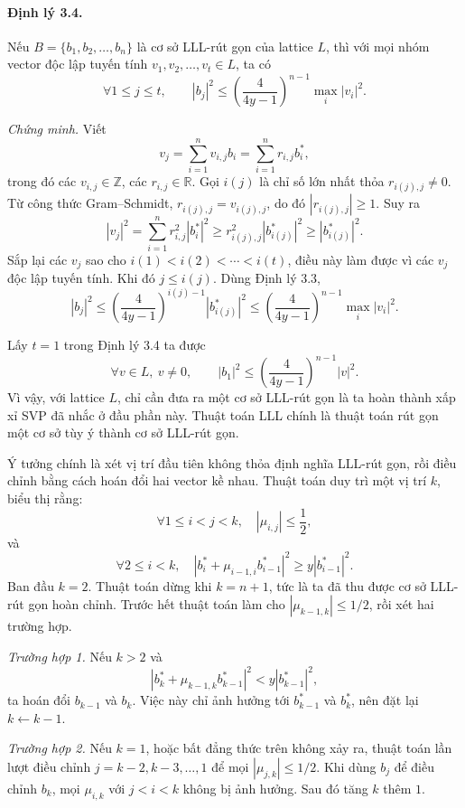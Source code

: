 \documentclass[11pt]{article}
\begin{document}
\paragraph{Định lý 3.4.}
Nếu \(B=\{b_1,b_2,\ldots,b_n\}\) là cơ sở LLL-rút gọn của lattice \(L\), thì
với mọi nhóm vector độc lập tuyến tính \(v_1,v_2,\ldots,v_t\in L\), ta có
\[
  \forall 1\le j\le t,\qquad
  |b_j|^2\le
  \left(\frac{4}{4y-1}\right)^{n-1}\max_i |v_i|^2.
\]

\emph{Chứng minh.}
Viết
\[
  v_j=\sum_{i=1}^{n}v_{i,j}b_i
     =\sum_{i=1}^{n}r_{i,j}b_i^*,
\]
trong đó các \(v_{i,j}\in\mathbb Z\), các \(r_{i,j}\in\mathbb R\). Gọi
\(i(j)\) là chỉ số lớn nhất thỏa \(r_{i(j),j}\ne0\). Từ công thức
Gram--Schmidt, \(r_{i(j),j}=v_{i(j),j}\), do đó \(|r_{i(j),j}|\ge1\). Suy ra
\[
  |v_j|^2=\sum_{i=1}^{n}r_{i,j}^2|b_i^*|^2
  \ge r_{i(j),j}^2|b_{i(j)}^*|^2
  \ge |b_{i(j)}^*|^2.
\]
Sắp lại các \(v_j\) sao cho \(i(1)<i(2)<\cdots<i(t)\), điều này làm được vì
các \(v_j\) độc lập tuyến tính. Khi đó \(j\le i(j)\). Dùng Định lý 3.3,
\[
  |b_j|^2
  \le \left(\frac{4}{4y-1}\right)^{i(j)-1}|b_{i(j)}^*|^2
  \le \left(\frac{4}{4y-1}\right)^{n-1}\max_i|v_i|^2.
\]

Lấy \(t=1\) trong Định lý 3.4 ta được
\[
  \forall v\in L,\ v\ne0,\qquad
  |b_1|^2\le \left(\frac{4}{4y-1}\right)^{n-1}|v|^2.
\]
Vì vậy, với lattice \(L\), chỉ cần đưa ra một cơ sở LLL-rút gọn là ta hoàn
thành xấp xỉ SVP đã nhắc ở đầu phần này. Thuật toán LLL chính là thuật toán
rút gọn một cơ sở tùy ý thành cơ sở LLL-rút gọn.

Ý tưởng chính là xét vị trí đầu tiên không thỏa định nghĩa LLL-rút gọn, rồi
điều chỉnh bằng cách hoán đổi hai vector kề nhau. Thuật toán duy trì một vị
trí \(k\), biểu thị rằng:
\[
  \forall 1\le i<j<k,\quad |\mu_{i,j}|\le\frac12,
\]
và
\[
  \forall 2\le i<k,\quad
  |b_i^*+\mu_{i-1,i}b_{i-1}^*|^2\ge y|b_{i-1}^*|^2.
\]
Ban đầu \(k=2\). Thuật toán dừng khi \(k=n+1\), tức là ta đã thu được cơ sở
LLL-rút gọn hoàn chỉnh. Trước hết thuật toán làm cho \(|\mu_{k-1,k}|\le1/2\),
rồi xét hai trường hợp.

\emph{Trường hợp 1.}
Nếu \(k>2\) và
\[
  |b_k^*+\mu_{k-1,k}b_{k-1}^*|^2<y|b_{k-1}^*|^2,
\]
ta hoán đổi \(b_{k-1}\) và \(b_k\). Việc này chỉ ảnh hưởng tới \(b_{k-1}^*\) và
\(b_k^*\), nên đặt lại \(k\leftarrow k-1\).

\emph{Trường hợp 2.}
Nếu \(k=1\), hoặc bất đẳng thức trên không xảy ra, thuật toán lần lượt điều
chỉnh \(j=k-2,k-3,\ldots,1\) để mọi \(|\mu_{j,k}|\le1/2\). Khi dùng \(b_j\) để
điều chỉnh \(b_k\), mọi \(\mu_{i,k}\) với \(j<i<k\) không bị ảnh hưởng. Sau đó
tăng \(k\) thêm \(1\).
\end{document}
